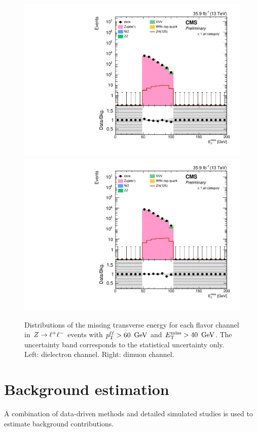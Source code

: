 \begin{figure}[hbtp]
\begin{center}
\includegraphics[width=\cmsFigWidth]{figures/presel_met_ee.pdf}
\includegraphics[width=\cmsFigWidth]{figures/presel_met_mm.pdf}
\caption{
  Distributions of the missing transverse energy for each flavor channel in $Z\to\ell^+\ell^-$ events with $p_{\mathrm{T}}^{\ell\ell} > 60~\,\text{Ge\hspace{-.08em}V}$ and $E_\mathrm{T}^{\mathrm{miss}} > 40~\,\text{Ge\hspace{-.08em}V}$.
  The uncertainty band corresponds to the statistical uncertainty only. Left: dielectron channel. Right: dimuon channel.
}
\label{fig:distributions_presel_met}
\end{center}
\end{figure}

\clearpage
\section{Background estimation}
\label{sec:dmbkg}
A combination of data-driven methods and detailed simulated studies is used to
estimate background contributions.

